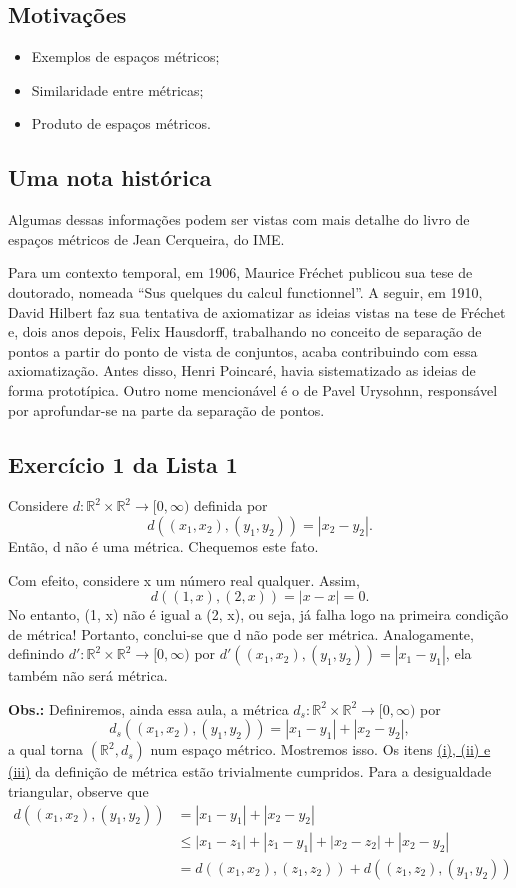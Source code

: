 \documentclass{article}
\begin{document}
\subsection{Motivações}
\begin{itemize}
  \item Exemplos de espaços métricos;
  \item Similaridade entre métricas;  
  \item Produto de espaços métricos.
\end{itemize}
\subsection{Uma nota histórica}
  Algumas dessas informações podem ser vistas com mais detalhe do livro de espaços métricos
de Jean Cerqueira, do IME. 

  Para um contexto temporal, em 1906, Maurice Fréchet publicou sua tese de doutorado, nomeada
``Sus quelques du calcul functionnel''. A seguir, em 1910, David Hilbert faz sua tentativa de axiomatizar
as ideias vistas na tese de Fréchet e, dois anos depois, Felix Hausdorff, trabalhando no conceito de separação de pontos
a partir do ponto de vista de conjuntos, acaba contribuindo com essa axiomatização. Antes disso, Henri Poincaré, havia sistematizado as ideias
de forma prototípica. Outro nome mencionável é o de Pavel Urysohnn, responsável por aprofundar-se na parte da separação de pontos.

\subsection{Exercício 1 da Lista 1}
  Considere \(d:\mathbb{R}^{2}\times \mathbb{R}^{2}\rightarrow [0, \infty) \) definida por 
    \[
      d((x_{1}, x_{2}), (y_{1}, y_{2})) = |x_{2}-y_{2}|.
    \]
  Então, d não é uma métrica. Chequemos este fato. 

  Com efeito, considere x um número real qualquer. Assim, 
    \[
      d((1, x), (2, x)) = |x-x| = 0.
    \]
  No entanto, (1, x) não é igual a (2, x), ou seja, já falha logo na primeira condição de métrica!
Portanto, conclui-se que d não pode ser métrica. Analogamente, definindo \(d':\mathbb{R}^{2}\times \mathbb{R}^{2}\rightarrow [0, \infty)\) por 
 \(d'((x_{1}, x_{2}), (y_{1}, y_{2}))=|x_{1}-y_{1}|\), ela também não será métrica.

 \textbf{Obs.:} Definiremos, ainda essa aula, a métrica \(d_{s}:\mathbb{R}^{2}\times \mathbb{R}^{2}\rightarrow [0, \infty)\) por 
   \[
     d_{s}((x_{1}, x_{2}), (y_{1}, y_{2})) = |x_{1}-y_{1}|+|x_{2}-y_{2}|,
   \]
   a qual torna \((\mathbb{R}^{2}, d_{s})\) num espaço métrico. Mostremos isso. Os itens \hyperlink{def_metric}{(i), (ii) e (iii)}
da definição de métrica estão trivialmente cumpridos. Para a desigualdade triangular, observe que 
\begin{align*}
  d((x_{1}, x_{2}), (y_{1}, y_{2})) &= |x_{1}-y_{1}| + |x_{2}-y_{2}| \\
                                    &\leq |x_{1}-z_{1}| + |z_{1}-y_{1}| + |x_{2}-z_{2}| + |x_{2}-y_{2}| \\
                                    &=d((x_{1}, x_{2}), (z_{1}, z_{2})) + d((z_{1}, z_{2}), (y_{1}, y_{2}))
\end{align*}
\end{document}
